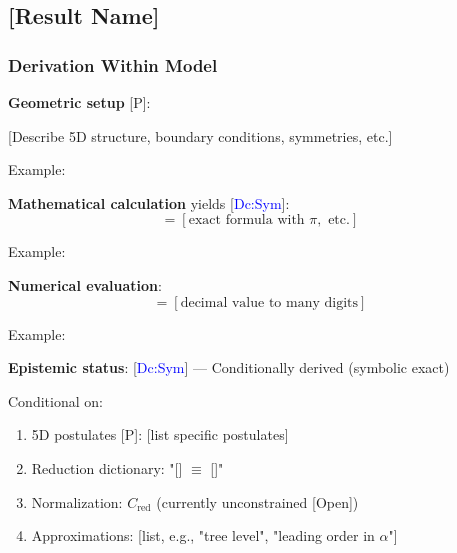 

\subsection{[Result Name]}
\label{sec:[result_label]}


\subsubsection{Derivation Within Model}

\textbf{Geometric setup} [P]:

[Describe 5D structure, boundary conditions, symmetries, etc.]

Example:

\textbf{Mathematical calculation} yields [\textcolor{blue}{Dc:Sym}]:
\begin{equation}
  [\text{quantity}] = [\text{exact formula with } \pi, \text{ etc.}]
  \label{eq:[result_formula]}
\end{equation}

Example:

\textbf{Numerical evaluation}:
\begin{equation}
  [\text{quantity}] = [\text{decimal value to many digits}]
\end{equation}

Example:

\textbf{Epistemic status}: [\textcolor{blue}{Dc:Sym}] — Conditionally derived (symbolic exact)

Conditional on:
\begin{enumerate}
\item 5D postulates [P]: [list specific postulates]
\item Reduction dictionary: "[] $\equiv$ []"
\item Normalization: $C_{\mathrm{red}}$ (currently unconstrained [Open])
\item Approximations: [list, e.g., "tree level", "leading order in $\alpha$"]
\end{enumerate}


